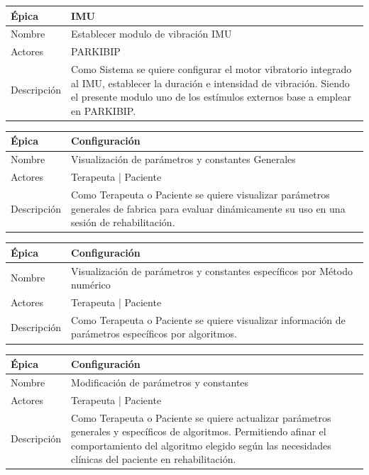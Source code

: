 \begin{table}[H] 
\centering
\begin{tabular}{| p{2cm} | p{10cm} |}
\hline
Épica & IMU\\ \hline
Nombre & Establecer modulo de vibración IMU\\ \hline
Actores & PARKIBIP\\ \hline
Descripción &  Como Sistema se quiere configurar el motor vibratorio integrado al IMU, establecer la duración e intensidad de vibración. Siendo el presente modulo uno de los estímulos externos base a emplear en PARKIBIP.\\ \hline
\end{tabular}
\end{table}

\begin{table}[H] 
\centering
\begin{tabular}{| p{2cm} | p{10cm} |}
\hline
Épica & Configuración\\ \hline
Nombre & Visualización de parámetros y constantes Generales\\ \hline
Actores & Terapeuta | Paciente\\ \hline
Descripción & Como Terapeuta o Paciente se quiere visualizar parámetros generales de fabrica para evaluar dinámicamente su uso en una sesión de rehabilitación. \\ \hline
\end{tabular}
\end{table}

\begin{table}[H] 
\centering
\begin{tabular}{| p{2cm} | p{10cm} |}
\hline
Épica & Configuración\\ \hline
Nombre & Visualización de parámetros y constantes específicos por Método numérico\\ \hline
Actores & Terapeuta | Paciente\\ \hline
Descripción & Como Terapeuta o Paciente se quiere visualizar información de parámetros específicos por algoritmos.  \\ \hline
\end{tabular}
\end{table}

\begin{table}[H] 
\centering
\begin{tabular}{| p{2cm} | p{10cm} |}
\hline
Épica & Configuración\\ \hline
Nombre & Modificación de parámetros y constantes\\ \hline
Actores & Terapeuta | Paciente\\ \hline
Descripción & Como Terapeuta o Paciente se quiere actualizar parámetros generales y específicos de algoritmos. Permitiendo afinar el comportamiento del algoritmo elegido según las necesidades clínicas del paciente en rehabilitación. \\ \hline
\end{tabular}
\end{table}

